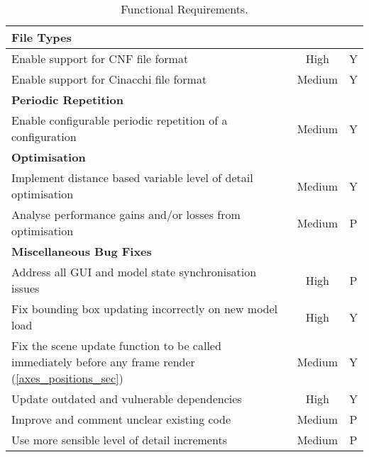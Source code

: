 \begin{table}
\begin{center}
\begin{adjustbox}{width=\textwidth}
\begin{tabular}{lcc}
       \hline
        \textbf{File Types} & &\\
       \hline
       Enable support for CNF file format & High & Y\\
       Enable support for Cinacchi file format & Medium & Y\\
        \hline
       \textbf{Periodic Repetition} & &\\
       \hline
       Enable configurable periodic repetition of a configuration & Medium & Y\\
        \hline
       \textbf{Optimisation} & &\\
       \hline
       Implement distance based variable level of detail optimisation & Medium & Y\\
        Analyse performance gains and/or losses from optimisation & Medium & P\\
      \hline
       \textbf{Miscellaneous Bug Fixes} & &\\
       \hline
       Address all GUI and model state synchronisation issues & High & P\\
       Fix bounding box updating incorrectly on new model load & High & Y\\
       Fix the scene update function to be called immediately before any frame render (\cref{axes_positions_sec}) & Medium & Y\\
       Update outdated and vulnerable dependencies & High & Y\\
       Improve and comment unclear existing code & Medium & P\\
       Use more sensible level of detail increments & Medium & P\\
       \hline\hline
    \end{tabular}
  \end{adjustbox}
  \end{center}
  \caption{Functional Requirements.}
  \label{tab:func}
\end{table}

